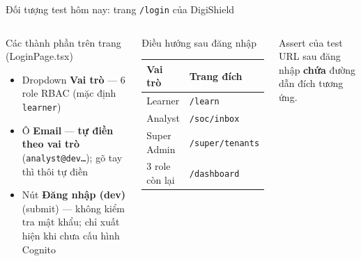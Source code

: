 \documentclass[aspectratio=169,12pt]{beamer}
\begin{document}
\begin{frame}{Đối tượng test hôm nay: trang \texttt{/login} của DigiShield}
  \begin{columns}[T]
    \begin{block}{Các thành phần trên trang (LoginPage.tsx)}
      \begin{itemize}
        \item Dropdown \textbf{Vai trò} --- 6 role RBAC
              (mặc định \texttt{learner})
        \item Ô \textbf{Email} --- \textbf{tự điền theo vai trò}
              (\texttt{analyst@dev\ldots}); gõ tay thì thôi tự điền
        \item Nút \textbf{Đăng nhập (dev)} (submit) --- không kiểm tra
              mật khẩu; chỉ xuất hiện khi chưa cấu hình Cognito
      \end{itemize}
    \end{block}

    \begin{block}{Điều hướng sau đăng nhập}
      \small
      \begin{tabular}{ll}
        \toprule
        \textbf{Vai trò} & \textbf{Trang đích} \\
        \midrule
        Learner & \texttt{/learn} \\
        Analyst & \texttt{/soc/inbox} \\
        Super Admin & \texttt{/super/tenants} \\
        3 role còn lại & \texttt{/dashboard} \\
        \bottomrule
      \end{tabular}
    \end{block}
    \begin{exampleblock}{Assert của test}
      URL sau đăng nhập \textbf{chứa} đường dẫn đích tương ứng.
    \end{exampleblock}
  \end{columns}
\end{frame}
\end{document}
